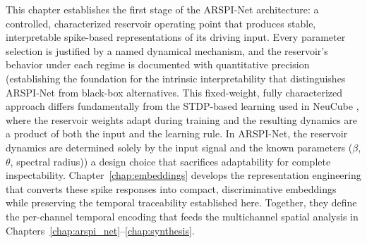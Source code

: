 This chapter establishes the first stage of the ARSPI-Net architecture: a controlled, characterized reservoir operating point that produces stable, interpretable spike-based representations of its driving input. Every parameter selection is justified by a named dynamical mechanism, and the reservoir's behavior under each regime is documented with quantitative precision (establishing the foundation for the intrinsic interpretability that distinguishes ARSPI-Net from black-box alternatives. This fixed-weight, fully characterized approach differs fundamentally from the STDP-based learning used in NeuCube \cite{kasabov_neucube_2014}, where the reservoir weights adapt during training and the resulting dynamics are a product of both the input and the learning rule. In ARSPI-Net, the reservoir dynamics are determined solely by the input signal and the known parameters ($\beta$, $\theta$, spectral radius)) a design choice that sacrifices adaptability for complete inspectability. Chapter~\ref{chap:embeddings} develops the representation engineering that converts these spike responses into compact, discriminative embeddings while preserving the temporal traceability established here. Together, they define the per-channel temporal encoding that feeds the multichannel spatial analysis in Chapters~\ref{chap:arspi_net}--\ref{chap:synthesis}.
